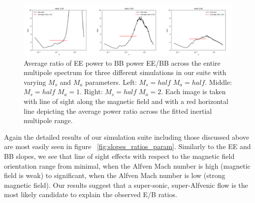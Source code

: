 \begin{figure}[h]
\includegraphics[width=\linewidth]{diff_ratios_x_Ma.png}
\caption{Average ratio of EE power to BB power EE/BB across the entire multipole
spectrum for three different simulations in our suite with varying $M_s$ and
$M_a$ parameters. Left: $M_s=half$ $M_a=half$.
Middle: $M_s=half$ $M_a=1$. Right: $M_s=half$ $M_a=2$. Each image is taken
with line of sight along the magnetic field and with a red horizontal line 
depicting the average power ratio across the fitted inertial multipole range.}
\label{fig:ratio_ma}
\end{figure}

Again the detailed results of our simulation suite including those discussed
above are most easily seen in figure ~\ref{fig:slopes_ratios_param}. Similarly
to the EE and BB slopes, we see that line of sight effects with respect to the
magnetic field orientation range from minimal, when the Alfven Mach number is
high (magnetic field is weak) to significant, when the Alfven Mach number is low
(strong magnetic field). Our results suggest that a super-sonic, super-Alfvenic
flow is the most likely candidate to explain the observed E/B ratios.
